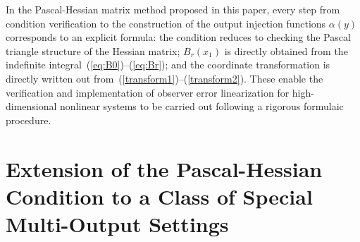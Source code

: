 \documentclass[11pt]{article}
\newtheorem{remark}{Remark}
\begin{document}

In the Pascal-Hessian matrix method proposed in this paper, every step from condition verification to the construction of the output injection functions $\alpha(y)$ corresponds to an explicit formula: the condition reduces to checking the Pascal triangle structure of the Hessian matrix; $B_r(x_1)$ is directly obtained from the indefinite integral~(\ref{eq:B0})--(\ref{eq:Br}); and the coordinate transformation is directly written out from~(\ref{transform1})--(\ref{transform2}). These enable the verification and implementation of observer error linearization for high-dimensional nonlinear systems to be carried out following a rigorous formulaic procedure.

\section{Extension of the Pascal-Hessian Condition to a Class of Special Multi-Output Settings}\label{sec4}
\end{document}
